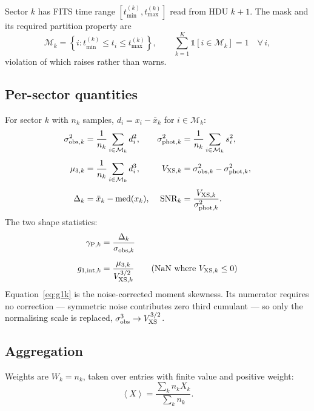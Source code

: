 \documentclass[11pt]{article}
\begin{document}
Sector $k$ has FITS time range $[t^{(k)}_{\min}, t^{(k)}_{\max}]$ read from HDU
$k+1$. The mask and its required partition property are
%
\begin{equation}
  \mathcal{M}_k = \left\{ i : t^{(k)}_{\min} \le t_i \le t^{(k)}_{\max} \right\},
  \qquad
  \sum_{k=1}^{K} \mathbb{1}\!\left[i \in \mathcal{M}_k\right] = 1
  \quad \forall\, i ,
  \label{eq:partition}
\end{equation}
%
violation of which raises rather than warns.

\subsection{Per-sector quantities}

For sector $k$ with $n_k$ samples, $d_i = x_i - \bar{x}_k$ for $i \in \mathcal{M}_k$:
%
\begin{align}
  \sigma_{{\rm obs},k}^{2}  &= \frac{1}{n_k}\sum_{i \in \mathcal{M}_k} d_i^{2},
  &
  \sigma_{{\rm phot},k}^{2} &= \frac{1}{n_k}\sum_{i \in \mathcal{M}_k} s_i^{2},
  \label{eq:seck1}\\[4pt]
  \mu_{3,k} &= \frac{1}{n_k}\sum_{i \in \mathcal{M}_k} d_i^{3},
  &
  V_{{\rm XS},k} &= \sigma_{{\rm obs},k}^{2} - \sigma_{{\rm phot},k}^{2},
  \label{eq:seck2}\\[4pt]
  \Delta_k &= \bar{x}_k - \mathrm{med}(x_k),
  &
  \mathrm{SNR}_k &= \frac{V_{{\rm XS},k}}{\sigma_{{\rm phot},k}^{2}} .
  \label{eq:seck3}
\end{align}
%
The two shape statistics:
%
\begin{align}
  \gamma_{{\rm P},k} &= \frac{\Delta_k}{\sigma_{{\rm obs},k}}
  \label{eq:gpk}\\[6pt]
  g_{1,{\rm int},k}  &= \frac{\mu_{3,k}}{V_{{\rm XS},k}^{3/2}}
  \qquad\text{(NaN where } V_{{\rm XS},k} \le 0\text{)}
  \label{eq:g1k}
\end{align}
%
Equation~\eqref{eq:g1k} is the noise-corrected moment skewness. Its numerator requires
no correction --- symmetric noise contributes zero third cumulant --- so only the
normalising scale is replaced, $\sigma_{\rm obs}^3 \to V_{\rm XS}^{3/2}$.

\subsection{Aggregation}

Weights are $W_k = n_k$, taken over entries with finite value and positive weight:
%
\begin{equation}
  \left\langle X \right\rangle = \frac{\sum_k n_k X_k}{\sum_k n_k} .
  \label{eq:wmean}
\end{equation}
\end{document}
